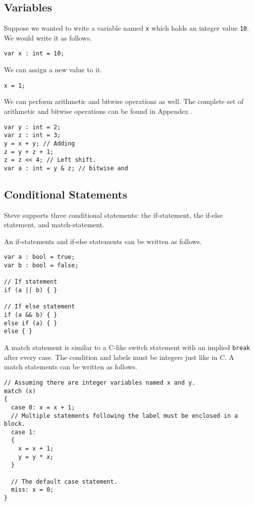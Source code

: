 \subsection{Variables} \label{variable_tut}

Suppose we wanted to write a variable named \texttt{x} which holds an integer value \texttt{10}. We would write it as follows.

\begin{lstlisting}
var x : int = 10;
\end{lstlisting}

We can assign a new value to it.

\begin{lstlisting}
x = 1;
\end{lstlisting}

We can perform arithmetic and bitwise operations as well. The complete set of arithmetic and bitwise operations can be found in Appendex \cite{ap:a}.

\begin{lstlisting}
var y : int = 2;
var z : int = 3;
y = x + y; // Adding
z = y + z + 1; 
z = z << 4; // Left shift.
var a : int = y & z; // bitwise and
\end{lstlisting}

\subsection{Conditional Statements} \label{condition_tut}

Steve supports three conditional statements: the if-statement, the if-else statement, and match-statement.

An if-statements and if-else statements can be written as follows.

\begin{lstlisting}
var a : bool = true;
var b : bool = false;

// If statement
if (a || b) { }

// If else statement
if (a && b) { }
else if (a) { }
else { }
\end{lstlisting}

A match statement is similar to a C-like switch statement with an implied \texttt{break} after every case. The condition and labels must be integers just like in C. A match statements can be written as follows.

\begin{lstlisting}
// Assuming there are integer variables named x and y.
match (x)
{
  case 0: x = x + 1;
  // Multiple statements following the label must be enclosed in a block.
  case 1:
  {
    x = x + 1;
    y = y * x;
  }
  
  // The default case statement.
  miss: x = 0;
}
\end{lstlisting}

